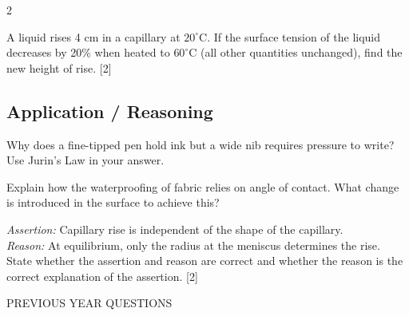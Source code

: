 \documentclass[12pt, a4paper]{exam}
\newcommand{\boxsection}[1]{%
    \par\vspace{0.6em}\noindent
    \begin{sectionbox}
        #1
    \end{sectionbox}
    \vspace{0.5em}
}
\begin{document}
\begin{multicols}{2}
\begin{questions}
\vspace{4em}

\question A liquid rises 4 cm in a capillary at $20^\circ$C. If the surface tension of the liquid decreases by 20\% when heated to $60^\circ$C (all other quantities unchanged), find the new height of rise. \hfill[2]

\vspace{3em}

\subsection*{Application / Reasoning}

\question Why does a fine-tipped pen hold ink but a wide nib requires pressure to write? Use Jurin's Law in your answer.
\vspace{3em}

\question Explain how the waterproofing of fabric relies on angle of contact. What change is introduced in the surface to achieve this?
\vspace{3em}

\question \textit{Assertion:} Capillary rise is independent of the shape of the capillary.\\
\textit{Reason:} At equilibrium, only the radius at the meniscus determines the rise.\\
State whether the assertion and reason are correct and whether the reason is the correct explanation of the assertion. \hfill[2]
\vspace{3em}

\end{questions}

\end{multicols}

\boxsection{PREVIOUS YEAR QUESTIONS}
\end{document}
